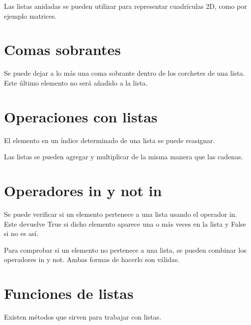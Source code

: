 \documentclass{report}
\begin{document}
Las listas anidadas se pueden utilizar para representar cuadrículas 2D, como por ejemplo matrices.


\section{Comas sobrantes}

Se puede dejar a lo más una coma sobrante dentro de los corchetes de una lista. Este último elemento no será añadido a la lista.


\section{Operaciones con listas}

El elemento en un índice determinado de una lista se puede reasignar.


Las listas se pueden agregar y multiplicar de la misma manera que las cadenas.


\section{Operadores in y not in}

Se puede verificar si un elemento pertenece a una lista usando el operador in. Este devuelve True si dicho elemento aparece una o más veces en la lista y False si no es así.


Para comprobar si un elemento no pertenece a una lista, se pueden combinar los operadores in y not. Ambas formas de hacerlo son válidas.


\section{Funciones de listas}

Existen métodos que sirven para trabajar con listas.
\end{document}
